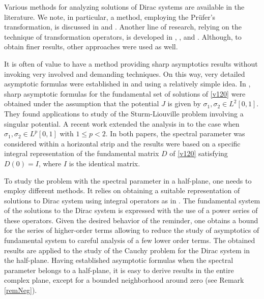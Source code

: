 \documentclass[11pt]{amsart}
\theoremstyle{plain}
\theoremstyle{definition}
\theoremstyle{remark}
\numberwithin{equation}{section}
\begin{document}
Various methods for analyzing solutions of Dirac systems are available in the literature. We note, in particular, a  method, employing the Pr\"{u}fer's transformation, is discussed in \cite{S} and \cite{SSDirac}. Another line of research, relying on  the technique of transformation operators, is developed in \cite{LM20}, \cite{L23}, and \cite{LMal24}. Although,  to obtain finer results, other approaches were used as well.

It is often of value to have a method providing sharp asymptotics results without invoking very involved and demanding techniques.
On this way, very detailed asymptotic formulas were established in \cite{GRZ1} and \cite{Rzep21} using a relatively simple idea. In \cite{GRZ1}, sharp asymptotic formulas for the fundamental set of solutions
of \eqref{v120} were obtained under the assumption that the potential $J$ is given by $\sigma_1, \sigma_2 \in L^2[0,1].$ They found applications to study of the Sturm-Liouville problem involving a singular potential. A recent work \cite{Rzep21} extended the analysis in \cite{GRZ1} to the case when
$\sigma_1, \sigma_2 \in L^p[0,1]$ with $1 \leq p <  2$. In both papers, the spectral parameter was considered within a horizontal strip
and the results were based on a specific integral representation of the fundamental matrix $D$ of \eqref{v120}
satisfying $D(0)=I$, where $I$ is the identical matrix.

To study the problem with the spectral parameter in a half-plane, one needs to employ different methods. %
It relies on obtaining a suitable representation of solutions to Dirac system using integral operators as in \cite{Rzep25}. The fundamental system of the solutions to the Dirac system is expressed with the use of a power series of these operators. Given the desired behavior of the reminder,  %
one obtains a bound for the series of higher-order terms allowing to reduce the study of asymptotics
of fundamental system
to careful analysis of a few lower order terms.
The obtained results are applied to the study of the Cauchy problem for the Dirac system in the half-plane.
Having established asymptotic formulas when the spectral parameter belongs to a half-plane, it is easy to derive results
 in the entire complex plane, except for a bounded neighborhood around zero (see Remark \ref{remNeg}).
\end{document}
